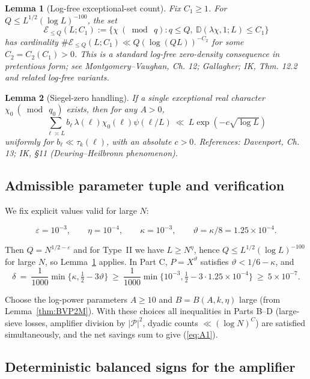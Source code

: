 \documentclass[11pt]{article}
\def\eqref#1{(\ref{#1})}%
\newtheorem{lemma}{Lemma}[part]
\theoremstyle{definition}
\theoremstyle{remark}
\numberwithin{equation}{part}
\begin{document}
\begin{lemma}[Log-free exceptional-set count]\label{lem:logfree-density}
	Fix $C_1\ge 1$. For $Q\le L^{1/2}(\log L)^{-100}$, the set
	\[
		\mathcal E_{\le Q}(L;C_1):=\{\chi\ (\bmod\ q): q\le Q,\ \mathbb D(\lambda\chi,1;L)\le C_1\}
	\]
	has cardinality $\#\mathcal E_{\le Q}(L;C_1)\ll Q(\log (QL))^{-C_2}$ for some $C_2=C_2(C_1)>0$. This is a standard log-free zero-density consequence in pretentious form; see Montgomery--Vaughan, Ch. 12; Gallagher; IK, Thm. 12.2 and related log-free variants.
\end{lemma}

\begin{lemma}[Siegel-zero handling]\label{lem:siegel}
	If a single exceptional real character $\chi_0\ (\bmod\ q_0)$ exists, then for any $A>0$,
	\[
		\sum_{\ell\asymp L} b_\ell\,\lambda(\ell)\chi_0(\ell)\psi(\ell/L)\ \ll\ L\exp(-c\sqrt{\log L})
	\]
	uniformly for $b_\ell\ll \tau_k(\ell)$, with an absolute $c>0$. References: Davenport, Ch. 13; IK, §11 (Deuring--Heilbronn phenomenon).
\end{lemma}

\subsection{Admissible parameter tuple and verification}

We fix explicit values valid for large $N$:

\[
	\varepsilon=10^{-3},\qquad \eta=10^{-4},\qquad \kappa=10^{-3},\qquad \vartheta=\kappa/8=1.25\times 10^{-4}.
\]

Then $Q=N^{1/2-\varepsilon}$ and for Type~II we have $L\ge N^{\eta}$, hence $Q\le L^{1/2}(\log L)^{-100}$ for large $N$, so Lemma~\ref{lem:logfree-density} applies. In Part C, $P=X^{\vartheta}$ satisfies $\vartheta<1/6-\kappa$, and
\[
	\delta\ =\ \frac1{1000}\min\{\kappa,\tfrac12-3\vartheta\}\ \ge\ \frac{1}{1000}\min\{10^{-3},\tfrac12-3\cdot 1.25\times 10^{-4}\}\ \ge\ 5\times 10^{-7}.
\]

Choose the log-power parameters $A\ge 10$ and $B=B(A,k,\eta)$ large (from Lemma~\ref{thm:BVP2M}). With these choices all inequalities in Parts B--D (large-sieve losses, amplifier division by $|\mathcal P|^2$, dyadic counts $\ll (\log N)^C$) are satisfied simultaneously, and the net savings sum to give \eqref{eq:A1}.

\subsection{Deterministic balanced signs for the amplifier}
\end{document}
